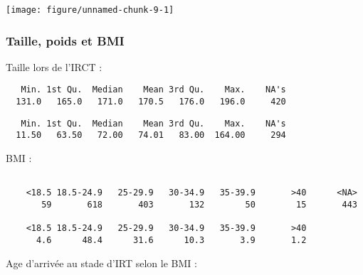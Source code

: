 \documentclass[11pt,a4paper]{article}\usepackage[]{graphicx}\usepackage[]{color}
\makeatletter
\def\maxwidth{ %
  \ifdim\Gin@nat@width>\linewidth
    \linewidth
  \else
    \Gin@nat@width
  \fi
}
\newenvironment{kframe}{%
 \def\at@end@of@kframe{}%
 \ifinner\ifhmode%
  \def\at@end@of@kframe{\end{minipage}}%
  \begin{minipage}{\columnwidth}%
 \fi\fi%
 \def\FrameCommand##1{\hskip\@totalleftmargin \hskip-\fboxsep
 \colorbox{shadecolor}{##1}\hskip-\fboxsep
     \hskip-\linewidth \hskip-\@totalleftmargin \hskip\columnwidth}%
 \MakeFramed {\advance\hsize-\width
   \@totalleftmargin\z@ \linewidth\hsize
   \@setminipage}}%
 {\par\unskip\endMakeFramed%
 \at@end@of@kframe}
\newenvironment{knitrout}{}{} %
\makeatother
\begin{document}
\begin{knitrout}
\color{fgcolor}
\texttt{[image: figure/unnamed-chunk-9-1]} 

\end{knitrout}

    \subsubsection{Taille, poids et BMI}
  
Taille lors de l'IRCT :
  
\begin{knitrout}
\color{fgcolor}\begin{kframe}
\begin{verbatim}
   Min. 1st Qu.  Median    Mean 3rd Qu.    Max.    NA's 
  131.0   165.0   171.0   170.5   176.0   196.0     420 
\end{verbatim}
\end{kframe}
\end{knitrout}

\begin{knitrout}
\color{fgcolor}\begin{kframe}
\begin{verbatim}
   Min. 1st Qu.  Median    Mean 3rd Qu.    Max.    NA's 
  11.50   63.50   72.00   74.01   83.00  164.00     294 
\end{verbatim}
\end{kframe}
\end{knitrout}

BMI :

\begin{knitrout}
\color{fgcolor}\begin{kframe}
\begin{verbatim}

    <18.5 18.5-24.9   25-29.9   30-34.9   35-39.9       >40      <NA> 
       59       618       403       132        50        15       443 

    <18.5 18.5-24.9   25-29.9   30-34.9   35-39.9       >40 
      4.6      48.4      31.6      10.3       3.9       1.2 
\end{verbatim}
\end{kframe}
\end{knitrout}

Age d'arrivée au stade d'IRT selon le BMI :
\end{document}
